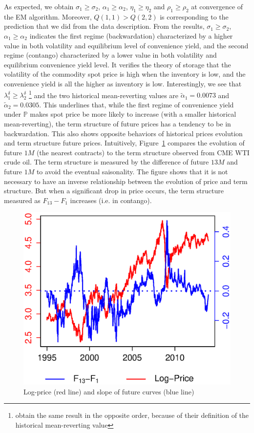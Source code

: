 As expected, we obtain $\sigma_1 \geq \sigma_2$, $\alpha_1 \geq \alpha_2$, $\eta_1 \geq \eta_2$ and $\rho_1 \geq \rho_2$ at convergence of the EM algorithm. Moreover, $Q(1,1) > Q(2,2)$ is corresponding to the prediction that we did from the data description. From the results, $\sigma_1 \geq \sigma_2$, $\alpha_1 \geq \alpha_2$ indicates the first regime (backwardation) characterized by a higher value in both volatility and equilibrium level of convenience yield, and the second regime (contango) characterized by a lower value in both volatility and equilibrium convenience yield level. It verifies the theory of storage that the volatility of the commodity spot price is high when the inventory is low, and the convenience yield is all the higher as inventory is low.
Interestingly, we see that $\lambda^{\delta}_1 \geq \lambda^{\delta}_2$ \footnote{\cite{almansour:2016} obtain the same result in the opposite order, because of their definition of the historical mean-reverting value} and the two historical mean-reverting values are $\widetilde{\alpha}_1 = 0.0073$ and $\widetilde{\alpha}_2 = 0.0305$. This underlines that, while the first regime of convenience yield under $\mathbb{P}$ makes spot price be more likely to increase (with a smaller historical mean-reverting), the term structure of future prices has a tendency to be in backwardation. 
	This also shows opposite behaviors of historical prices evolution and term structure future prices. Intuitively, Figure~\ref{fig:LogPriceTermStructure:data} compares the evolution of future $1M$ (the nearest contracts) to the term structure observed from CME WTI crude oil. The term structure is measured by the difference of future $13M$ and future $1M$ to avoid the eventual saisonality. The figure shows that it is not necessary to have an inverse relationship between the evolution of price and term structure. But when a significant drop in price occurs, the term structure measured as $F_{13} - F_1$ increases (i.e. in contango).
\begin{figure}
\centering
\includegraphics[scale=.6]{LogPrice_TermStructure.eps}
\caption{Log-price (red line) and slope of future curves (blue line)}
\label{fig:LogPriceTermStructure:data}
\end{figure}
